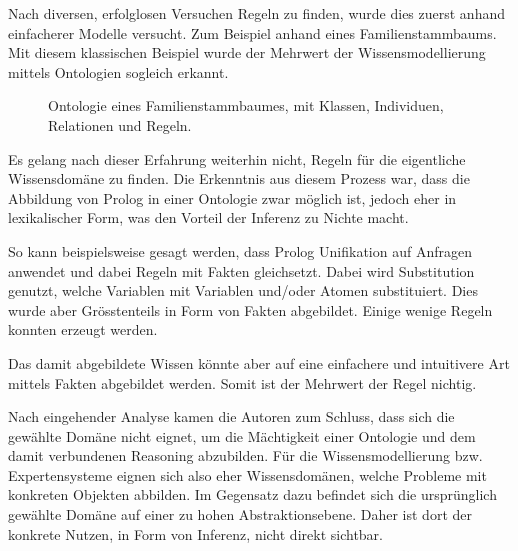 Nach diversen, erfolglosen Versuchen Regeln zu finden, wurde dies zuerst anhand einfacherer Modelle versucht. Zum Beispiel anhand eines Familienstammbaums. Mit diesem klassischen Beispiel wurde der Mehrwert der Wissensmodellierung mittels Ontologien sogleich erkannt.

\begin{figure}[H]
\centering {}
\caption{Ontologie eines Familienstammbaumes, mit Klassen, Individuen, Relationen und Regeln.\label{fig:familien_netz}\protect\footnotemark}
\end{figure}

Es gelang nach dieser Erfahrung weiterhin nicht, Regeln für die eigentliche Wissensdomäne zu finden. Die Erkenntnis aus diesem Prozess war, dass die Abbildung von Prolog in einer Ontologie zwar möglich ist, jedoch eher in lexikalischer Form, was den Vorteil der Inferenz zu Nichte macht.

So kann beispielsweise gesagt werden, dass Prolog Unifikation auf Anfragen anwendet und dabei Regeln mit Fakten gleichsetzt. Dabei wird Substitution genutzt, welche Variablen mit Variablen und/oder Atomen substituiert. Dies wurde aber Grösstenteils in Form von Fakten abgebildet. Einige wenige Regeln konnten erzeugt werden.

Das damit abgebildete Wissen könnte aber auf eine einfachere und intuitivere Art mittels Fakten abgebildet werden. Somit ist der Mehrwert der Regel nichtig.

Nach eingehender Analyse kamen die Autoren zum Schluss, dass sich die gewählte Domäne nicht eignet, um die Mächtigkeit einer Ontologie und dem damit verbundenen Reasoning abzubilden. Für die Wissensmodellierung bzw. Expertensysteme eignen sich also eher Wissensdomänen, welche Probleme mit konkreten Objekten abbilden. Im Gegensatz dazu befindet sich die ursprünglich gewählte Domäne auf einer zu hohen Abstraktionsebene. Daher ist dort der konkrete Nutzen, in Form von Inferenz, nicht direkt sichtbar.

